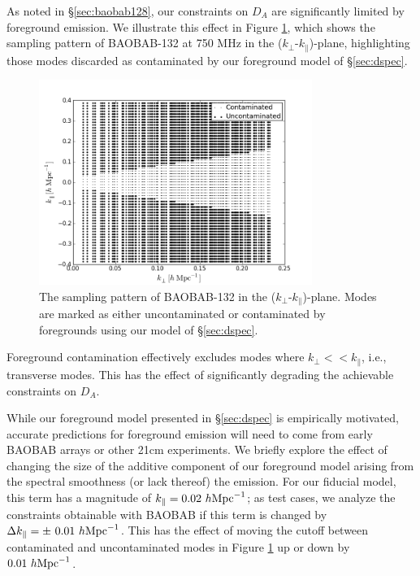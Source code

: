 \documentclass[10pt,iop]{emulateapj}
\begin{document}
As noted in \S\ref{sec:baobab128}, our constraints on $D_A$ are significantly limited by foreground
emission.  We illustrate this effect in Figure \ref{fig:fgloss}, which shows the sampling pattern
of BAOBAB-132 at 750 MHz in the ($k_{\perp}$-$k_{\parallel}$)-plane, highlighting those modes 
discarded as contaminated by our foreground model of \S\ref{sec:dspec}.  
\begin{figure}\centering
\includegraphics[width=3.5in]{fgloss.png}
\caption{The sampling pattern of BAOBAB-132 in the ($k_{\perp}$-$k_{\parallel}$)-plane.  Modes are 
marked as either uncontaminated or 
contaminated by foregrounds using our model of \S\ref{sec:dspec}.
} \label{fig:fgloss}
\end{figure}
Foreground
contamination effectively excludes modes where $k_{\perp} << k_{\parallel}$, i.e., transverse
modes.  This has the effect of significantly degrading the achievable constraints on $D_A$.

While our foreground model presented in \S\ref{sec:dspec} is empirically motivated, 
accurate predictions for foreground emission
will need to come from early BAOBAB arrays or other 21cm experiments.  We briefly explore the effect
of changing the size of the additive component of our foreground model arising from the
spectral smoothness (or lack thereof) the emission.  For our fiducial model, this term has a
magnitude of $k_{\parallel} = 0.02~h{\rm Mpc}^{-1}$; as test cases, we analyze the constraints
obtainable with BAOBAB if this term is changed by $\Delta k_{\parallel} = 
\pm~0.01~h{\rm Mpc}^{-1}$.  
This has the effect of moving the cutoff between contaminated and uncontaminated modes in Figure
\ref{fig:fgloss} up or down by $0.01~h{\rm Mpc}^{-1}$.
\end{document}
